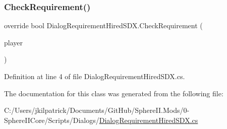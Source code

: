 \subsubsection{\texorpdfstring{CheckRequirement()}{CheckRequirement()}}
{\footnotesize\ttfamily override bool Dialog\+Requirement\+Hired\+S\+D\+X.\+Check\+Requirement (\begin{DoxyParamCaption}\item[{Entity\+Player}]{player }\end{DoxyParamCaption})}



Definition at line 4 of file Dialog\+Requirement\+Hired\+S\+D\+X.\+cs.



The documentation for this class was generated from the following file\+:\begin{DoxyCompactItemize}
\item 
C\+:/\+Users/jkilpatrick/\+Documents/\+Git\+Hub/\+Sphere\+I\+I.\+Mods/0-\/\+Sphere\+I\+I\+Core/\+Scripts/\+Dialogs/\mbox{\hyperlink{_dialog_requirement_hired_s_d_x_8cs}{Dialog\+Requirement\+Hired\+S\+D\+X.\+cs}}\end{DoxyCompactItemize}
